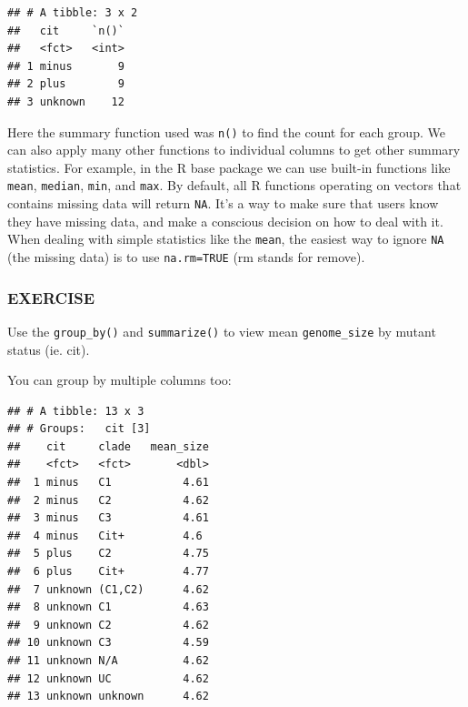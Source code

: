 \documentclass[]{book}
\newenvironment{Shaded}{\begin{snugshade}}{\end{snugshade}}
\newcommand{\DataTypeTok}[1]{\textcolor[rgb]{0.13,0.29,0.53}{#1}}
\newcommand{\KeywordTok}[1]{\textcolor[rgb]{0.13,0.29,0.53}{\textbf{#1}}}
\newcommand{\NormalTok}[1]{#1}
\newcommand{\OperatorTok}[1]{\textcolor[rgb]{0.81,0.36,0.00}{\textbf{#1}}}
\newcommand{\OtherTok}[1]{\textcolor[rgb]{0.56,0.35,0.01}{#1}}
\newcommand{\StringTok}[1]{\textcolor[rgb]{0.31,0.60,0.02}{#1}}
\begin{document}
\begin{verbatim}
## # A tibble: 3 x 2
##   cit     `n()`
##   <fct>   <int>
## 1 minus       9
## 2 plus        9
## 3 unknown    12
\end{verbatim}

Here the summary function used was \texttt{n()} to find the count for each group. We can also apply many other functions to individual columns to get other summary statistics. For example, in the R base package we can use built-in functions like \texttt{mean}, \texttt{median}, \texttt{min}, and \texttt{max}. By default, all R functions operating on vectors that contains missing data will return \texttt{NA}. It's a way to make sure that users know they have missing data, and make a conscious decision on how to deal with it. When dealing with simple statistics like the \texttt{mean}, the easiest way to ignore \texttt{NA} (the missing data) is to use \texttt{na.rm=TRUE} (rm stands for remove).

\hypertarget{exercise-19}{%
\subsubsection*{EXERCISE}\label{exercise-19}}

Use the \texttt{group\_by()} and \texttt{summarize()} to view mean \texttt{genome\_size} by mutant status (ie. cit).

You can group by multiple columns too:

\begin{Shaded}
\end{Shaded}

\begin{verbatim}
## # A tibble: 13 x 3
## # Groups:   cit [3]
##    cit     clade   mean_size
##    <fct>   <fct>       <dbl>
##  1 minus   C1           4.61
##  2 minus   C2           4.62
##  3 minus   C3           4.61
##  4 minus   Cit+         4.6 
##  5 plus    C2           4.75
##  6 plus    Cit+         4.77
##  7 unknown (C1,C2)      4.62
##  8 unknown C1           4.63
##  9 unknown C2           4.62
## 10 unknown C3           4.59
## 11 unknown N/A          4.62
## 12 unknown UC           4.62
## 13 unknown unknown      4.62
\end{verbatim}
\end{document}
